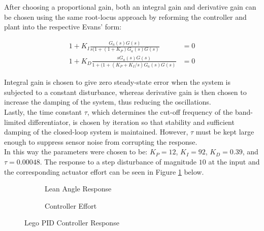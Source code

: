 After choosing a proportional gain, both an integral gain and derivative gain can be chosen using the same root-locus approach by reforming the controller and plant into the respective Evans' form:

\begin{align*}
1 + K_I \frac{G_a(s) G(s)}{s (1 + (1 + K_P) G_a(s) G(s)} &= 0 \\
1 + K_D \frac{s G_a(s) G(s)}{1 + (1 + (K_P + K_I/s) G_a(s) G(s)} &= 0
\end{align*}

Integral gain is chosen to give zero steady-state error when the system is subjected to a constant disturbance, whereas derivative gain is then chosen to increase the damping of the system, thus reducing the oscillations. \\

Lastly, the time constant $\tau$, which determines the cut-off frequency of the band-limited differentiator, is chosen by iteration so that stability and sufficient damping of the closed-loop system is maintained. However, $\tau$ must be kept large enough to suppress sensor noise from corrupting the response. \\

In this way the parameters were chosen to be: $K_P=12$, $K_I=92$, $K_D=0.39$, and $\tau=0.00048$. The response to a step disturbance of magnitude $10$ at the input and the corresponding actuator effort can be seen in Figure \ref{fig:pidLego} below.

\begin{figure}[H]
	\begin{subfigure}{0.5\textwidth}
	\caption{Lean Angle Response}
	\end{subfigure}
	\quad
	\begin{subfigure}{0.5\textwidth}
	\caption{Controller Effort}
	\end{subfigure}
	\caption{Lego PID Controller Response}
	\label{fig:pidLego}
\end{figure}

